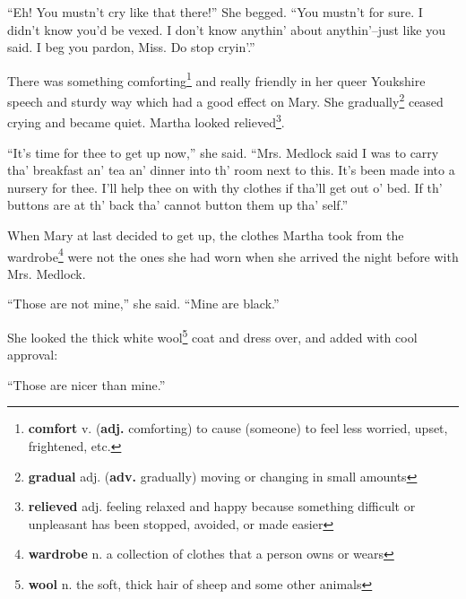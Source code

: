 ``Eh! You mustn't cry like that there!'' She begged. ``You mustn't for sure. I didn't know you'd be vexed. I don't know anythin' about anythin'--just like you said. I beg you pardon, Miss. Do stop cryin'.''

There was something comforting\footnote{\textbf{comfort} v. (\textbf{adj.} comforting) to cause (someone) to feel less worried, upset, frightened, etc.} and really friendly in her queer Youkshire speech and sturdy way which had a good effect on Mary. She gradually\footnote{\textbf{gradual} adj. (\textbf{adv.} gradually) moving or changing in small amounts} ceased crying and became quiet. Martha looked relieved\footnote{\textbf{relieved} adj. feeling relaxed and happy because something difficult or unpleasant has been stopped, avoided, or made easier}.

``It's time for thee to get up now,'' she said. ``Mrs. Medlock said I was to carry tha' breakfast an' tea an' dinner into th' room next to this. It's been made into a nursery for thee. I'll help thee on with thy clothes if tha'll get out o' bed. If th' buttons are at th' back tha' cannot button them up tha' self.''

When Mary at last decided to get up, the clothes Martha took from the wardrobe\footnote{\textbf{wardrobe} n. a collection of clothes that a person owns or wears} were not the ones she had worn when she arrived the night before with Mrs. Medlock.

``Those are not mine,'' she said. ``Mine are black.''

She looked the thick white wool\footnote{\textbf{wool} n. the soft, thick hair of sheep and some other animals} coat and dress over, and added with cool approval:

``Those are nicer than mine.''
